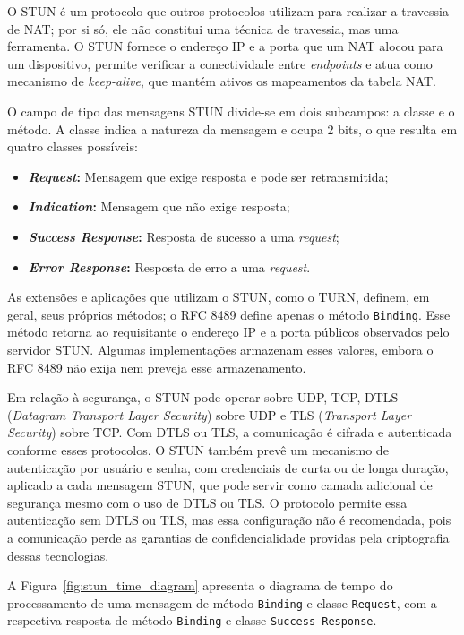 O STUN é um protocolo que outros protocolos utilizam para realizar a travessia de NAT; por si só, ele não constitui uma técnica de travessia, mas uma ferramenta. O STUN fornece o endereço IP e a porta que um NAT alocou para um dispositivo, permite verificar a conectividade entre \textit{endpoints} e atua como mecanismo de \textit{keep-alive}, que mantém ativos os mapeamentos da tabela NAT.

O campo de tipo das mensagens STUN divide-se em dois subcampos: a classe e o método. A classe indica a natureza da mensagem e ocupa 2 bits, o que resulta em quatro classes possíveis:

\begin{itemize}
    \item \textbf{\textit{Request}:} Mensagem que exige resposta e pode ser retransmitida;
    \item \textbf{\textit{Indication}:} Mensagem que não exige resposta;
    \item \textbf{\textit{Success Response}:} Resposta de sucesso a uma \textit{request};
    \item \textbf{\textit{Error Response}:} Resposta de erro a uma \textit{request}.
\end{itemize}

As extensões e aplicações que utilizam o STUN, como o TURN, definem, em geral, seus próprios métodos; o RFC 8489 \citep{rfc8489} define apenas o método \texttt{Binding}. Esse método retorna ao requisitante o endereço IP e a porta públicos observados pelo servidor STUN. Algumas implementações armazenam esses valores, embora o RFC 8489 não exija nem preveja esse armazenamento.

Em relação à segurança, o STUN pode operar sobre UDP, TCP, DTLS (\textit{Datagram Transport Layer Security}) sobre UDP e TLS (\textit{Transport Layer Security}) sobre TCP. Com DTLS ou TLS, a comunicação é cifrada e autenticada conforme esses protocolos. O STUN também prevê um mecanismo de autenticação por usuário e senha, com credenciais de curta ou de longa duração, aplicado a cada mensagem STUN, que pode servir como camada adicional de segurança mesmo com o uso de DTLS ou TLS. O protocolo permite essa autenticação sem DTLS ou TLS, mas essa configuração não é recomendada, pois a comunicação perde as garantias de confidencialidade providas pela criptografia dessas tecnologias.

A Figura~\ref{fig:stun_time_diagram} apresenta o diagrama de tempo do processamento de uma mensagem de método \texttt{Binding} e classe \texttt{Request}, com a respectiva resposta de método \texttt{Binding} e classe \texttt{Success Response}.

